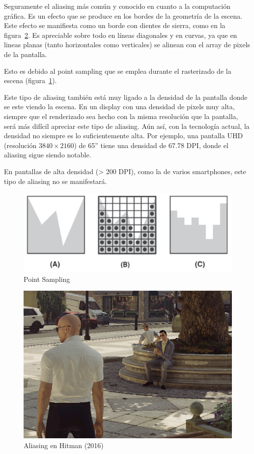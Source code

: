 \documentclass[withindex, glossary]{cam-thesis}
\begin{document}
Seguramente el aliasing más común y conocido en cuanto a la computación gráfica. Es un efecto que se produce en los bordes de la geometría de la escena. Este efecto se manifiesta como un borde con dientes de sierra, como en la figura~\ref{hitmanaliasing}. Es apreciable sobre todo en líneas diagonales y en curvas, ya que en lineas planas (tanto horizontales como verticales) se alinean con el array de pixels de la pantalla.

Esto es debido al point sampling que se emplea durante el rasterizado de la escena (figura~\ref{pointsampling}).

Este tipo de aliasing también está muy ligado a la densidad de la pantalla donde se este viendo la escena. En un display con una densidad de pixels muy alta, siempre que el renderizado sea hecho con la misma resolución que la pantalla, será más difícil apreciar este tipo de aliasing. Aún así, con la tecnología actual, la densidad no siempre es lo suficientemente alta. Por ejemplo, una pantalla UHD (resolución $3840 \times 2160$) de 65'' tiene una densidad de 67.78 DPI, donde el aliasing sigue siendo notable.

En pantallas de alta densidad (> 200 DPI\cite{googledpi}), como la de varios smartphones, este tipo de aliasing no se manifestará.

\begin{figure}[!htbp]
    \includegraphics[width=.7\linewidth]{figures/pointsampling.png}
    \caption{Point Sampling\cite{Shreiner:2013:OPG:2544032}}
    \label{pointsampling}
\end{figure}

\begin{figure}[!htbp]
    \includegraphics[width=.8\linewidth]{figures/hitmanaliasing.png}
    \caption{Aliasing en Hitman (2016)}
    \label{hitmanaliasing}
\end{figure}
\end{document}
